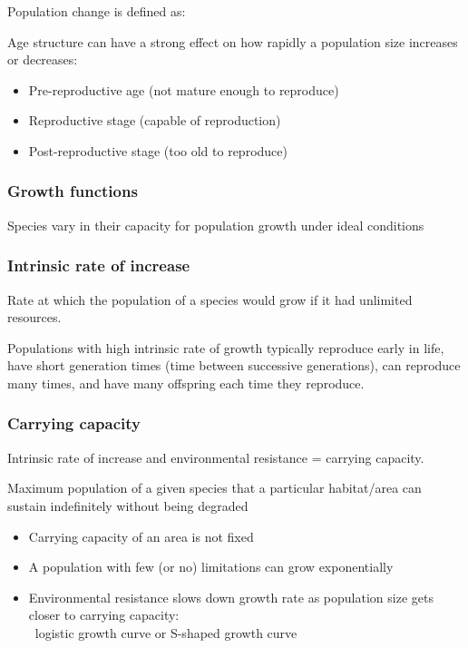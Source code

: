 \documentclass{article}
\begin{document}
Population change is defined as:

Age structure can have a strong effect on how rapidly a population size increases or decreases:
\begin{itemize}
    \item Pre-reproductive age (not mature enough to reproduce)
    \item Reproductive stage (capable of reproduction)
    \item Post-reproductive stage (too old to reproduce)
\end{itemize}

\subsubsection{Growth functions}
Species vary in their capacity for population growth under ideal conditions

\subsubsection{Intrinsic rate of increase}
Rate at which the population of a species would grow if it had unlimited resources.

Populations with high intrinsic rate of growth typically reproduce early in life, have short
generation times (time between successive generations), can reproduce many times, and have
many offspring each time they reproduce.

\subsubsection{Carrying capacity}
Intrinsic rate of increase and environmental resistance = carrying capacity.

Maximum population of a given species that a particular habitat/area can sustain
indefinitely without being degraded

\begin{itemize}
    \item Carrying capacity of an area is not fixed
    \item A population with few (or no) limitations can grow exponentially
    \item Environmental resistance slows down growth rate as population size gets closer to carrying capacity:\\\textrightarrow\ logistic growth curve or S-shaped growth curve
\end{itemize}
\end{document}
